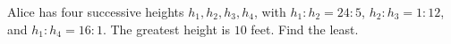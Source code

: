 Alice has four successive heights $h_1,h_2,h_3,h_4$, with $h_1:h_2=24:5$, $h_2:h_3=1:12$, and $h_1:h_4=16:1$. The greatest height is $10$ feet. Find the least.
